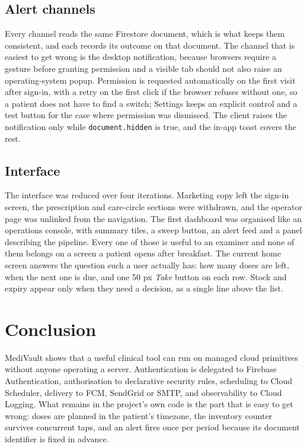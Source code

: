 \documentclass[11pt,a4paper]{report}
\begin{document}
\section{Alert channels}

Every channel reads the same Firestore document, which is what keeps them consistent, and each records
its outcome on that document. The channel that is easiest to get wrong is the desktop notification,
because browsers require a gesture before granting permission and a visible tab should not also raise an
operating-system popup. Permission is requested automatically on the first visit after sign-in, with a
retry on the first click if the browser refuses without one, so a patient does not have to find a switch;
Settings keeps an explicit control and a test button for the case where permission was dismissed. The
client raises the notification only while \texttt{document.hidden} is true, and the in-app toast covers the
rest.

\section{Interface}

The interface was reduced over four iterations. Marketing copy left the sign-in screen, the prescription
and care-circle sections were withdrawn, and the operator page was unlinked from the navigation. The
first dashboard was organised like an operations console, with summary tiles, a sweep button, an alert
feed and a panel describing the pipeline. Every one of those is useful to an examiner and none of them
belongs on a screen a patient opens after breakfast. The current home screen answers the question such a
user actually has: how many doses are left, when the next one is due, and one 50 px \emph{Take} button on
each row. Stock and expiry appear only when they need a decision, as a single line above the list.

\chapter{Conclusion}

MediVault shows that a useful clinical tool can run on managed cloud primitives without anyone operating
a server. Authentication is delegated to Firebase Authentication, authorisation to declarative security
rules, scheduling to Cloud Scheduler, delivery to FCM, SendGrid or SMTP, and observability to Cloud Logging.
What remains in the project's own code is the part that is easy to get wrong: doses are planned in the
patient's timezone, the inventory counter survives concurrent taps, and an alert fires once per period
because its document identifier is fixed in advance.
\end{document}
